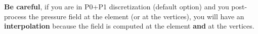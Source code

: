 

\textbf{Be careful}, if you are in P0+P1 discretization (default option) and you post-process the pressure field at the element (or at the vertices), you will have an \textbf{interpolation} because the field is computed at the element \textbf{and} at the vertices. \\




